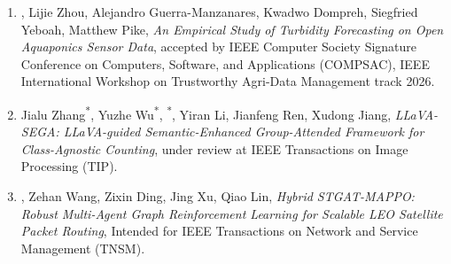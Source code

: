\begin{enumerate}[leftmargin=*]
    \vspace{-0.5em}
    \item \textbf{\cvName}, Lijie Zhou, Alejandro Guerra-Manzanares, Kwadwo Dompreh, Siegfried Yeboah, Matthew Pike, \textit{An Empirical Study of Turbidity Forecasting on Open Aquaponics Sensor Data}, accepted by IEEE Computer Society Signature Conference on Computers, Software, and Applications (COMPSAC), IEEE International Workshop on Trustworthy Agri-Data Management track 2026.
    \vspace{-0.5em}
    \item {Jialu Zhang}\textsuperscript{*}, {Yuzhe Wu}\textsuperscript{*}, \textbf{\cvName}\textsuperscript{*}, Yiran Li, Jianfeng Ren, Xudong Jiang, \textit{LLaVA-SEGA: LLaVA-guided Semantic-Enhanced Group-Attended Framework for Class-Agnostic Counting}, under review at IEEE Transactions on Image Processing (TIP).
    \vspace{-0.5em}
    \item \textbf{\cvName}, Zehan Wang, Zixin Ding, Jing Xu, Qiao Lin, \textit{Hybrid STGAT-MAPPO: Robust Multi-Agent Graph Reinforcement Learning for Scalable LEO Satellite Packet Routing}, Intended for IEEE Transactions on Network and Service Management (TNSM).
    \vspace{-0em}
\end{enumerate}
\vspace{-5.5mm}%